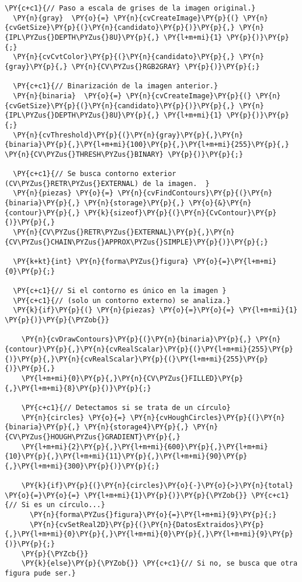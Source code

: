 \begin{Verbatim}[commandchars=\\\{\}]
  \PY{c+c1}{// Paso a escala de grises de la imagen original.}
  \PY{n}{gray}  \PY{o}{=} \PY{n}{cvCreateImage}\PY{p}{(} \PY{n}{cvGetSize}\PY{p}{(}\PY{n}{candidato}\PY{p}{)}\PY{p}{,} \PY{n}{IPL\PYZus{}DEPTH\PYZus{}8U}\PY{p}{,} \PY{l+m+mi}{1} \PY{p}{)}\PY{p}{;}
  \PY{n}{cvCvtColor}\PY{p}{(}\PY{n}{candidato}\PY{p}{,} \PY{n}{gray}\PY{p}{,} \PY{n}{CV\PYZus{}RGB2GRAY} \PY{p}{)}\PY{p}{;}
  
  \PY{c+c1}{// Binarización de la imagen anterior.}
  \PY{n}{binaria}  \PY{o}{=} \PY{n}{cvCreateImage}\PY{p}{(} \PY{n}{cvGetSize}\PY{p}{(}\PY{n}{candidato}\PY{p}{)}\PY{p}{,} \PY{n}{IPL\PYZus{}DEPTH\PYZus{}8U}\PY{p}{,} \PY{l+m+mi}{1} \PY{p}{)}\PY{p}{;}
  \PY{n}{cvThreshold}\PY{p}{(}\PY{n}{gray}\PY{p}{,}\PY{n}{binaria}\PY{p}{,}\PY{l+m+mi}{100}\PY{p}{,}\PY{l+m+mi}{255}\PY{p}{,} \PY{n}{CV\PYZus{}THRESH\PYZus{}BINARY} \PY{p}{)}\PY{p}{;}
  
  \PY{c+c1}{// Se busca contorno exterior (CV\PYZus{}RETR\PYZus{}EXTERNAL) de la imagen.  }
  \PY{n}{piezas} \PY{o}{=} \PY{n}{cvFindContours}\PY{p}{(}\PY{n}{binaria}\PY{p}{,} \PY{n}{storage}\PY{p}{,} \PY{o}{&}\PY{n}{contour}\PY{p}{,} \PY{k}{sizeof}\PY{p}{(}\PY{n}{CvContour}\PY{p}{)}\PY{p}{,}
  \PY{n}{CV\PYZus{}RETR\PYZus{}EXTERNAL}\PY{p}{,}\PY{n}{CV\PYZus{}CHAIN\PYZus{}APPROX\PYZus{}SIMPLE}\PY{p}{)}\PY{p}{;}
  
  \PY{k+kt}{int} \PY{n}{forma\PYZus{}figura} \PY{o}{=}\PY{l+m+mi}{0}\PY{p}{;}
  
  \PY{c+c1}{// Si el contorno es único en la imagen }
  \PY{c+c1}{// (solo un contorno externo) se analiza.}
  \PY{k}{if}\PY{p}{(} \PY{n}{piezas} \PY{o}{=}\PY{o}{=} \PY{l+m+mi}{1} \PY{p}{)}\PY{p}{\PYZob{}} 
    
    \PY{n}{cvDrawContours}\PY{p}{(}\PY{n}{binaria}\PY{p}{,} \PY{n}{contour}\PY{p}{,}\PY{n}{cvRealScalar}\PY{p}{(}\PY{l+m+mi}{255}\PY{p}{)}\PY{p}{,}\PY{n}{cvRealScalar}\PY{p}{(}\PY{l+m+mi}{255}\PY{p}{)}\PY{p}{,}
    \PY{l+m+mi}{0}\PY{p}{,}\PY{n}{CV\PYZus{}FILLED}\PY{p}{,}\PY{l+m+mi}{8}\PY{p}{)}\PY{p}{;}

    \PY{c+c1}{// Detectamos si se trata de un círculo}
    \PY{n}{circles} \PY{o}{=} \PY{n}{cvHoughCircles}\PY{p}{(}\PY{n}{binaria}\PY{p}{,} \PY{n}{storage4}\PY{p}{,} \PY{n}{CV\PYZus{}HOUGH\PYZus{}GRADIENT}\PY{p}{,}
    \PY{l+m+mi}{2}\PY{p}{,}\PY{l+m+mi}{600}\PY{p}{,}\PY{l+m+mi}{10}\PY{p}{,}\PY{l+m+mi}{11}\PY{p}{,}\PY{l+m+mi}{90}\PY{p}{,}\PY{l+m+mi}{300}\PY{p}{)}\PY{p}{;}      
    
    \PY{k}{if}\PY{p}{(}\PY{n}{circles}\PY{o}{-}\PY{o}{>}\PY{n}{total} \PY{o}{=}\PY{o}{=} \PY{l+m+mi}{1}\PY{p}{)}\PY{p}{\PYZob{}} \PY{c+c1}{// Si es un círculo...}
      \PY{n}{forma\PYZus{}figura}\PY{o}{=}\PY{l+m+mi}{9}\PY{p}{;}
      \PY{n}{cvSetReal2D}\PY{p}{(}\PY{n}{DatosExtraidos}\PY{p}{,}\PY{l+m+mi}{0}\PY{p}{,}\PY{l+m+mi}{0}\PY{p}{,}\PY{l+m+mi}{9}\PY{p}{)}\PY{p}{;}
    \PY{p}{\PYZcb{}}
    \PY{k}{else}\PY{p}{\PYZob{}} \PY{c+c1}{// Si no, se busca que otra figura pude ser.}
      

\end{Verbatim}

